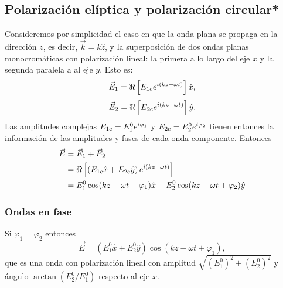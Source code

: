 \subsection{Polarización elíptica y polarización circular*}
Consideremos por simplicidad el caso en que la onda plana se propaga en la dirección $z$, es decir, $\vec{k}=k\hat{z}$, y la superposición de dos ondas planas monocromáticas con polarización lineal: la primera a lo largo del eje $x$ y la segunda paralela a al eje $y$. Esto es:
\begin{equation}
\vec{E}_1=\Re\left[E_{1\rm c} e^{i(kz-\omega t)}\right]\hat{x},
\end{equation}
\begin{equation}
\vec{E}_2=\Re\left[E_{2\rm c} e^{i(kz-\omega t)}\right]\hat{y}.
\end{equation}
Las amplitudes complejas $E_{1\rm c}=E_{1}^0e^{i\varphi_1}$ y $E_{2\rm c}=E_{2}^0e^{i\varphi_2}$ tienen entonces la información de las amplitudes y fases de cada onda componente. Entonces
\begin{align}
\vec{E} &= \vec{E}_1+\vec{E}_2 \\
&= \Re\left[\left(E_{1\rm c}\hat{x}+E_{2\rm c}\hat{y}\right) e^{i(kz-\omega t)}\right] \label{E12-2} \\
&= E_{1}^0\cos(kz-\omega t+\varphi_1)\hat{x} + E_{2}^0\cos(kz-\omega t+\varphi_2)\hat{y}
\end{align}

\subsubsection{Ondas en fase}
 Si $\varphi_1=\varphi_2$ entonces
\begin{equation}
\vec{E} = (E_{1}^0\hat{x}+E_{2}^0\hat{y})\cos(kz-\omega t+\varphi_1),
\end{equation}
que es una onda con polarización lineal con amplitud $\sqrt{(E_{1}^0)^2+(E_{2}^0)^2}$ y ángulo $\arctan(E_{2}^0/E_{1}^0)$ respecto al eje $x$.


